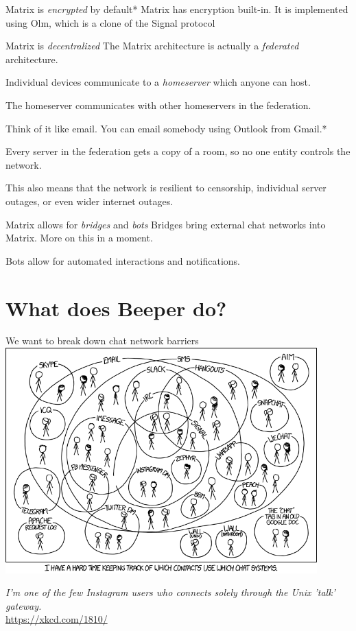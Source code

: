 \documentclass{acm}
\begin{document}
\begin{frame}{Matrix is \textit{encrypted} by default*}
    Matrix has encryption built-in. It is implemented using Olm, which is a
    clone of the Signal protocol

\end{frame}

\begin{frame}{Matrix is \textit{decentralized}}
    The Matrix architecture is actually a \textit{federated} architecture.

    Individual devices communicate to a \textit{homeserver} which anyone can
    host.

    The homeserver communicates with other homeservers in the federation.
    \pause

    Think of it like email. You can email somebody using Outlook from Gmail.*
    \pause

    Every server in the federation gets a copy of a room, so no one entity
    controls the network.
    \pause

    This also means that the network is resilient to censorship, individual
    server outages, or even wider internet outages.
\end{frame}

\begin{frame}{Matrix allows for \textit{bridges} and \textit{bots}}
    Bridges bring external chat networks into Matrix. More on this in a moment.
    \pause

    Bots allow for automated interactions and notifications.
\end{frame}

\section{What does Beeper do?}

\begin{frame}{We want to break down chat network barriers}
    \centering
    \includegraphics[width=0.9\textwidth]{graphics/chat_systems.png}

    \scriptsize
    \textit{I'm one of the few Instagram users who connects solely through the
    Unix 'talk' gateway.}\\
    \tiny
    \url{https://xkcd.com/1810/}
\end{frame}
\end{document}
